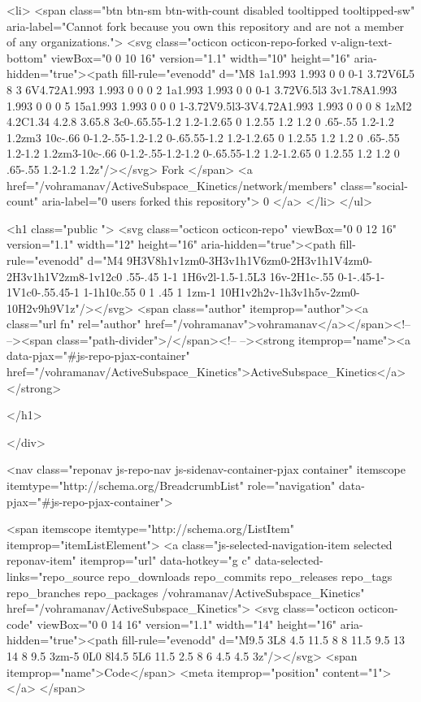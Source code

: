   <li>
        <span class="btn btn-sm btn-with-count disabled tooltipped tooltipped-sw" aria-label="Cannot fork because you own this repository and are not a member of any organizations.">
          <svg class="octicon octicon-repo-forked v-align-text-bottom" viewBox="0 0 10 16" version="1.1" width="10" height="16" aria-hidden="true"><path fill-rule="evenodd" d="M8 1a1.993 1.993 0 0 0-1 3.72V6L5 8 3 6V4.72A1.993 1.993 0 0 0 2 1a1.993 1.993 0 0 0-1 3.72V6.5l3 3v1.78A1.993 1.993 0 0 0 5 15a1.993 1.993 0 0 0 1-3.72V9.5l3-3V4.72A1.993 1.993 0 0 0 8 1zM2 4.2C1.34 4.2.8 3.65.8 3c0-.65.55-1.2 1.2-1.2.65 0 1.2.55 1.2 1.2 0 .65-.55 1.2-1.2 1.2zm3 10c-.66 0-1.2-.55-1.2-1.2 0-.65.55-1.2 1.2-1.2.65 0 1.2.55 1.2 1.2 0 .65-.55 1.2-1.2 1.2zm3-10c-.66 0-1.2-.55-1.2-1.2 0-.65.55-1.2 1.2-1.2.65 0 1.2.55 1.2 1.2 0 .65-.55 1.2-1.2 1.2z"/></svg>
          Fork
</span>
    <a href="/vohramanav/ActiveSubspace_Kinetics/network/members" class="social-count"
       aria-label="0 users forked this repository">
      0
    </a>
  </li>
</ul>

      <h1 class="public ">
  <svg class="octicon octicon-repo" viewBox="0 0 12 16" version="1.1" width="12" height="16" aria-hidden="true"><path fill-rule="evenodd" d="M4 9H3V8h1v1zm0-3H3v1h1V6zm0-2H3v1h1V4zm0-2H3v1h1V2zm8-1v12c0 .55-.45 1-1 1H6v2l-1.5-1.5L3 16v-2H1c-.55 0-1-.45-1-1V1c0-.55.45-1 1-1h10c.55 0 1 .45 1 1zm-1 10H1v2h2v-1h3v1h5v-2zm0-10H2v9h9V1z"/></svg>
  <span class="author" itemprop="author"><a class="url fn" rel="author" href="/vohramanav">vohramanav</a></span><!--
--><span class="path-divider">/</span><!--
--><strong itemprop="name"><a data-pjax="#js-repo-pjax-container" href="/vohramanav/ActiveSubspace_Kinetics">ActiveSubspace_Kinetics</a></strong>

</h1>

    </div>
    
<nav class="reponav js-repo-nav js-sidenav-container-pjax container"
     itemscope
     itemtype="http://schema.org/BreadcrumbList"
     role="navigation"
     data-pjax="#js-repo-pjax-container">

  <span itemscope itemtype="http://schema.org/ListItem" itemprop="itemListElement">
    <a class="js-selected-navigation-item selected reponav-item" itemprop="url" data-hotkey="g c" data-selected-links="repo_source repo_downloads repo_commits repo_releases repo_tags repo_branches repo_packages /vohramanav/ActiveSubspace_Kinetics" href="/vohramanav/ActiveSubspace_Kinetics">
      <svg class="octicon octicon-code" viewBox="0 0 14 16" version="1.1" width="14" height="16" aria-hidden="true"><path fill-rule="evenodd" d="M9.5 3L8 4.5 11.5 8 8 11.5 9.5 13 14 8 9.5 3zm-5 0L0 8l4.5 5L6 11.5 2.5 8 6 4.5 4.5 3z"/></svg>
      <span itemprop="name">Code</span>
      <meta itemprop="position" content="1">
</a>  </span>

